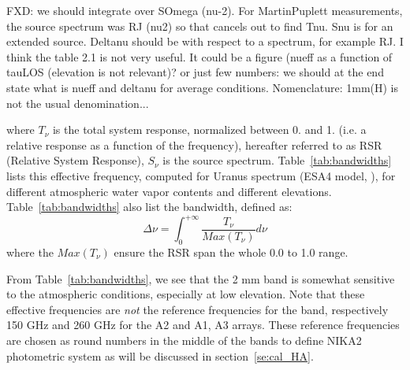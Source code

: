 {\color{blue} FXD: we should integrate over SOmega (nu-2). For
  MartinPuplett measurements, the source spectrum was RJ (nu2) so that
  cancels out to find Tnu. Snu is for an extended source. Deltanu
  should be with respect to a spectrum, for example RJ. I think the
  table 2.1 is not very useful. It could be a figure (nueff as a
  function of tauLOS (elevation is not relevant)? or just few numbers:
  we should at the end state what is nueff and deltanu for average
  conditions. Nomenclature: 1mm(H) is not the usual denomination... }


where $T_{\nu}$ is the total system response, normalized between
0. and 1. (i.e. a relative response as a function of the frequency),
hereafter referred to as RSR (Relative System Response), $S_{\nu}$ is
the source spectrum. Table~\ref{tab:bandwidths} lists this effective frequency,
computed for Uranus spectrum (ESA4 model, \cite{ESAmodel}), for different atmospheric
water vapor contents and different elevations. 
Table~\ref{tab:bandwidths} also list the bandwidth, defined as:
\begin{equation}
\Delta\nu = \int_{0}^{+\infty} \frac{T_{\nu}}{Max(T_{\nu})}
d\nu
\end{equation}
where the $Max(T_{\nu})$ ensure the RSR span the whole 0.0 to 1.0 range.

From Table~\ref{tab:bandwidths}, we see that the 2 mm band is somewhat
sensitive to the atmospheric conditions, especially at low
elevation. Note that these effective frequencies are {\em not} the
reference frequencies for the band, respectively 150 GHz and 260 GHz
for the A2 and A1, A3 arrays. These reference frequencies are chosen
as round numbers in the middle of the bands to define NIKA2
photometric system as will be discussed in section~\ref{se:cal_HA}.

%
%





